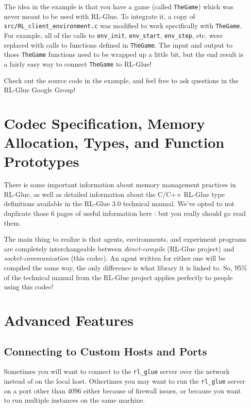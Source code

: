 \documentclass[11pt]{article}
\begin{document}
The idea in the example is that you have a game (called \texttt{TheGame}) which was never meant to be used
with RL-Glue.  To integrate it, a copy of \texttt{src/RL\_client\_environment.c} was modified to work 
specifically with \texttt{TheGame}.  For example, all of the calls to \texttt{env\_init}, \texttt{env\_start}, \texttt{env\_step}, etc. were replaced with calls to functions defined in \texttt{TheGame}.  The input and output to those \texttt{TheGame} functions need to be wrapped up a little
 bit, but the end result is a fairly easy way to connect \texttt{TheGame} to RL-Glue!

Check out the source code in the example, and feel free to ask questions in the RL-Glue Google Group!


\section{Codec Specification, Memory Allocation, Types, and Function Prototypes}
There is some important information about memory management practices in RL-Glue, as well as detailed information about the C/C++ RL-Glue type definitions available in the 
RL-Glue 3.0 technical manual.  We've opted to not duplicate those 6 pages of useful information here : but you really should go read them.

The main thing to realize is that agents, environments, and experiment programs are completely interchangeable between \textit{direct-compile} (RL-Glue project) and \textit{socket-communication}
(this codec).  An agent written for either one will be compiled the same way, the only difference is what library it is linked to.  So, 95\% of the technical manual from the RL-Glue project applies 
perfectly to people using this codec! 




\section{Advanced Features}
\subsection{Connecting to Custom Hosts and Ports}
Sometimes you will want to connect to the \texttt{rl\_glue} server over the network instead of 
on the local host.  Othertimes you may want to run the \texttt{rl\_glue} server on a port other than
$4096$ either because of firewall issues, or because you want to run multiple instances on the same machine.
\end{document}
